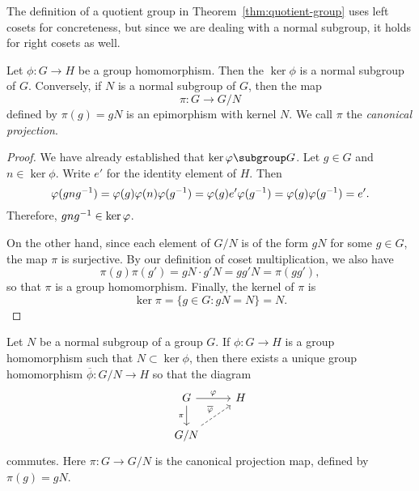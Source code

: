 \begin{remark}
    The definition of a quotient group in Theorem~\ref{thm:quotient-group} uses
    left cosets for concreteness, but since we are dealing with a normal
    subgroup, it holds for right cosets as well.
\end{remark}

\begin{theorem}
    Let \(\phi : G \to H\) be a group homomorphism. Then the \(\ker \phi\) is a
    normal subgroup of \(G\). Conversely, if \(N\) is a normal subgroup of
    \(G\), then the map
    \[
        \pi : G \to G/N
    \]
    defined by \(\pi(g) = gN\) is an epimorphism with kernel \(N\). We call
    \(\pi\) the \emph{canonical projection}.
\end{theorem}

\begin{proof}
    We have already established that \(\ker \phi \subgroup G\). Let \(g \in G\)
    and \(n \in \ker \phi\). Write \(e'\) for the identity element of \(H\).
    Then
    \[
        \varphi(gng^{-1}) = \varphi(g)\varphi(n)\varphi(g^{-1}) = \varphi(g)e'\varphi(g^{-1}) = \varphi(g)\varphi(g^{-1}) = e'.
    \]
    Therefore, \(gng^{-1} \in \ker \varphi\).

    On the other hand, since each element of \(G/N\) is of the form \(gN\) for
    some \(g \in G\), the map \(\pi\) is surjective. By our definition of coset
    multiplication, we also have
    \[
        \pi(g)\pi(g') = gN \cdot g'N = gg'N = \pi(gg'),
    \]
    so that \(\pi\) is a group homomorphism. Finally, the kernel of \(\pi\) is
    \[
        \ker \pi = \{g \in G : gN = N\} = N.
    \]
\end{proof}

\begin{theorem}
    \label{thm:induced-homomorphism}
    Let \(N\) be a normal subgroup of a group \(G\). If \(\phi: G \to H\) is a
    group homomorphism such that \(N \subset \ker \phi\), then there exists a
    unique group homomorphism \(\overline{\phi}: G/N \to H\) so that the diagram
    \[
        \begin{tikzcd}
            G \arrow{r}{\phi} \arrow[swap]{d}{\pi} & H \\
            G/N \arrow[dashed]{ur}{\overline{\phi}}
        \end{tikzcd}
    \]
    commutes. Here \(\pi: G \to G/N\) is the canonical projection map, defined
    by \(\pi(g) = gN\).
\end{theorem}

